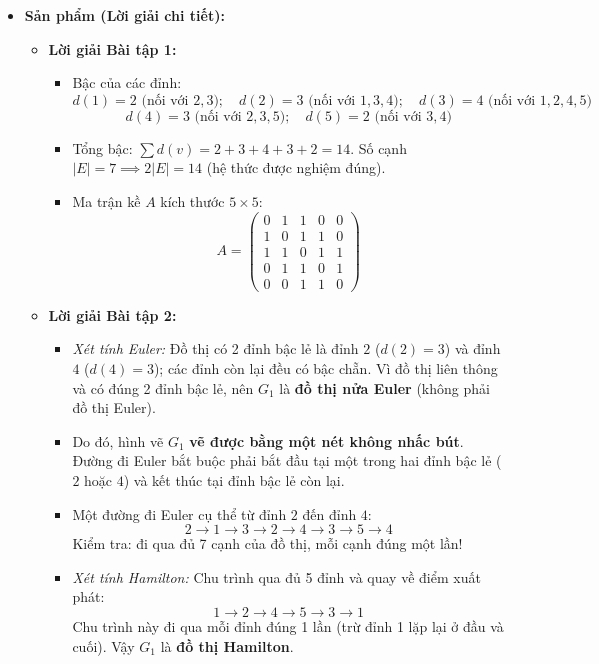 \documentclass[12pt, a4paper]{article}
\begin{document}
\begin{itemize}[leftmargin=1.2cm]
    \item[c)] \textbf{Sản phẩm (Lời giải chi tiết):}
    \begin{itemize}[leftmargin=0.6cm]
        \item \textbf{Lời giải Bài tập 1:}
        \begin{itemize}
            \item Bậc của các đỉnh:
            $$d(1) = 2 \text{ (nối với } 2, 3); \quad d(2) = 3 \text{ (nối với } 1, 3, 4); \quad d(3) = 4 \text{ (nối với } 1, 2, 4, 5)$$
            $$d(4) = 3 \text{ (nối với } 2, 3, 5); \quad d(5) = 2 \text{ (nối với } 3, 4)$$
            \item Tổng bậc: $\sum d(v) = 2 + 3 + 4 + 3 + 2 = 14$. Số cạnh $|E| = 7 \implies 2|E| = 14$ (hệ thức được nghiệm đúng).
            \item Ma trận kề $A$ kích thước $5 \times 5$:
            $$A = \begin{pmatrix}
            0 & 1 & 1 & 0 & 0 \\
            1 & 0 & 1 & 1 & 0 \\
            1 & 1 & 0 & 1 & 1 \\
            0 & 1 & 1 & 0 & 1 \\
            0 & 0 & 1 & 1 & 0
            \end{pmatrix}$$
        \end{itemize}
        \item \textbf{Lời giải Bài tập 2:}
        \begin{itemize}
            \item \textit{Xét tính Euler:} Đồ thị có 2 đỉnh bậc lẻ là đỉnh $2$ ($d(2)=3$) và đỉnh $4$ ($d(4)=3$); các đỉnh còn lại đều có bậc chẵn. Vì đồ thị liên thông và có đúng 2 đỉnh bậc lẻ, nên $G_1$ là \textbf{đồ thị nửa Euler} (không phải đồ thị Euler).
            \item Do đó, hình vẽ $G_1$ \textbf{vẽ được bằng một nét không nhấc bút}. Đường đi Euler bắt buộc phải bắt đầu tại một trong hai đỉnh bậc lẻ ($2$ hoặc $4$) và kết thúc tại đỉnh bậc lẻ còn lại.
            \item Một đường đi Euler cụ thể từ đỉnh $2$ đến đỉnh $4$:
            $$2 \to 1 \to 3 \to 2 \to 4 \to 3 \to 5 \to 4$$
            Kiểm tra: đi qua đủ 7 cạnh của đồ thị, mỗi cạnh đúng một lần!
            \item \textit{Xét tính Hamilton:} Chu trình qua đủ 5 đỉnh và quay về điểm xuất phát:
            $$1 \to 2 \to 4 \to 5 \to 3 \to 1$$
            Chu trình này đi qua mỗi đỉnh đúng 1 lần (trừ đỉnh 1 lặp lại ở đầu và cuối). Vậy $G_1$ là \textbf{đồ thị Hamilton}.
        \end{itemize}
    \end{itemize}


\end{itemize}
\end{document}
